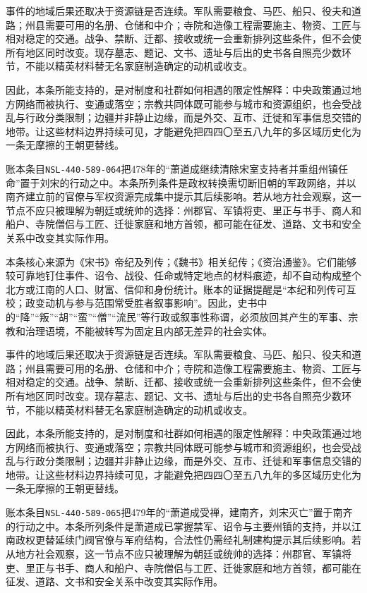 事件的地域后果还取决于资源链是否连续。军队需要粮食、马匹、船只、役夫和道路；州县需要可用的名册、仓储和中介；寺院和造像工程需要施主、物资、工匠与相对稳定的交通。战争、禁断、迁都、接收或统一会重新排列这些条件，但不会使所有地区同时改变。现存墓志、题记、文书、遗址与后出的史书各自照亮少数环节，不能以精英材料替无名家庭制造确定的动机或收支。

因此，本条所能支持的，是对制度和社群如何相遇的限定性解释：中央政策通过地方网络而被执行、变通或落空；宗教共同体既可能参与城市和资源组织，也会受战乱与行政分类限制；边疆并非静止边缘，而是外交、互市、迁徙和军事信息交错的地带。让这些材料边界持续可见，才能避免把四四〇至五八九年的多区域历史化为一条无摩擦的王朝更替线。

账本条目\texttt{NSL-440-589-064}把478年的“萧道成继续清除宋室支持者并重组州镇任命”置于刘宋的行动之中。本条所列条件是政权转换需切断旧朝的军政网络，并以南齐建立前的官僚与军权资源完成集中提示其后续影响。若从地方社会观察，这一节点不应只被理解为朝廷或统帅的选择：州郡官、军镇将吏、里正与书手、商人和船户、寺院僧侣与工匠、迁徙家庭和地方首领，都可能在征发、道路、文书和安全关系中改变其实际作用。

本条核心来源为《宋书》帝纪及列传；《魏书》相关纪传；《资治通鉴》。它们能够较可靠地钉住事件、诏令、战役、任命或特定地点的材料痕迹，却不自动构成整个北方或江南的人口、财富、信仰和身份统计。账本的证据提醒是“本纪和列传可互校；政变动机与参与范围常受胜者叙事影响”。因此，史书中的“降”“叛”“胡”“蛮”“僧”“流民”等行政或叙事性称谓，必须放回其产生的军事、宗教和治理语境，不能被转写为固定且内部无差异的社会实体。

事件的地域后果还取决于资源链是否连续。军队需要粮食、马匹、船只、役夫和道路；州县需要可用的名册、仓储和中介；寺院和造像工程需要施主、物资、工匠与相对稳定的交通。战争、禁断、迁都、接收或统一会重新排列这些条件，但不会使所有地区同时改变。现存墓志、题记、文书、遗址与后出的史书各自照亮少数环节，不能以精英材料替无名家庭制造确定的动机或收支。

因此，本条所能支持的，是对制度和社群如何相遇的限定性解释：中央政策通过地方网络而被执行、变通或落空；宗教共同体既可能参与城市和资源组织，也会受战乱与行政分类限制；边疆并非静止边缘，而是外交、互市、迁徙和军事信息交错的地带。让这些材料边界持续可见，才能避免把四四〇至五八九年的多区域历史化为一条无摩擦的王朝更替线。

账本条目\texttt{NSL-440-589-065}把479年的“萧道成受禅，建南齐，刘宋灭亡”置于南齐的行动之中。本条所列条件是萧道成已掌握禁军、诏令与主要州镇的支持，并以江南政权更替延续门阀官僚与军府结构，合法性仍需经礼制建构提示其后续影响。若从地方社会观察，这一节点不应只被理解为朝廷或统帅的选择：州郡官、军镇将吏、里正与书手、商人和船户、寺院僧侣与工匠、迁徙家庭和地方首领，都可能在征发、道路、文书和安全关系中改变其实际作用。

